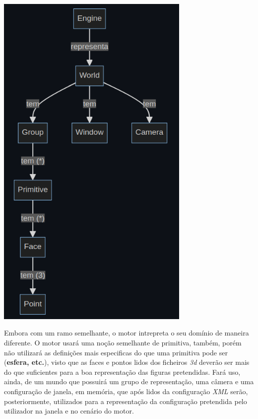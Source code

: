 \begin{center}
    \includegraphics[width=0.7\textwidth]{imgs/engdom.png}
    \label{fig:engdom}
\end{center}

\noindent
Embora com um ramo semelhante, o motor intrepreta o seu domínio de maneira
diferente.\newline
\break
\noindent
O motor usará uma noção semelhante de primitiva, também, porém não utilizará
as definições mais especificas do que uma primitiva pode ser
(\textbf{esfera, etc.}), visto que as faces e pontos lidos dos ficheiros 
\textit{3d} deverão ser mais do que suficientes para a boa representação
das figuras pretendidas.\newline
\break
\noindent
Fará uso, ainda, de um mundo que possuirá um grupo de representação, uma câmera
e uma configuração de janela, em memória, que após lidos
da configuração \textit{XML} serão, posteriormente, utilizados
para a representação da configuração pretendida
pelo utilizador na janela e no cenário do motor.

